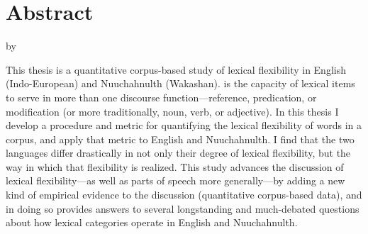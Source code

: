 \section*{Abstract}
\label{sec:abstract}

\begin{center}

  \doctitle

  by

  \theauthor

\end{center}

This thesis is a quantitative corpus-based study of lexical flexibility in English (Indo-European) and Nuuchahnulth (Wakashan).  is the capacity of lexical items to serve in more than one discourse function---reference, predication, or modification (or more traditionally, noun, verb, or adjective). In this thesis I develop a procedure and metric for quantifying the lexical flexibility of words in a corpus, and apply that metric to English and Nuuchahnulth. I find that the two languages differ drastically in not only their degree of lexical flexibility, but the way in which that flexibility is realized. This study advances the discussion of lexical flexibility---as well as parts of speech more generally---by adding a new kind of empirical evidence to the discussion (quantitative corpus-based data), and in doing so provides answers to several longstanding and much-debated questions about how lexical categories operate in English and Nuuchahnulth.

